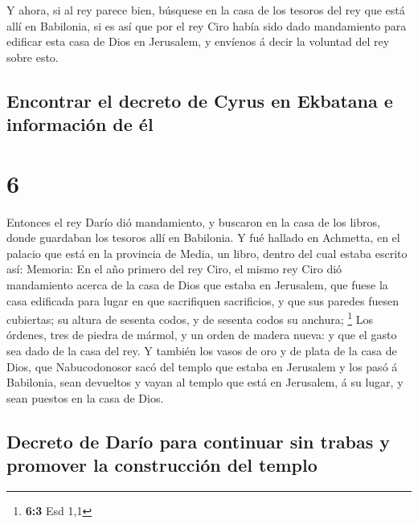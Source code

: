  Y ahora, si al rey parece bien, búsquese en la casa de los
tesoros del rey que está allí en Babilonia, si es así que por el rey
Ciro había sido dado mandamiento para edificar esta casa de Dios en
Jerusalem, y envíenos á decir la voluntad del rey sobre esto.

\hypertarget{encontrar-el-decreto-de-cyrus-en-ekbatana-e-informaciuxf3n-de-uxe9l}{%
\subsection{Encontrar el decreto de Cyrus en Ekbatana e información de
él}\label{encontrar-el-decreto-de-cyrus-en-ekbatana-e-informaciuxf3n-de-uxe9l}}

\hypertarget{section-5}{%
\section{6}\label{section-5}}

 Entonces el rey Darío dió mandamiento, y buscaron en la
casa de los libros, donde guardaban los tesoros allí en Babilonia.
 Y fué hallado en Achmetta, en el palacio que está en la
provincia de Media, un libro, dentro del cual estaba escrito así:
Memoria:  En el año primero del rey Ciro, el mismo rey Ciro
dió mandamiento acerca de la casa de Dios que estaba en Jerusalem, que
fuese la casa edificada para lugar en que sacrifiquen sacrificios, y que
sus paredes fuesen cubiertas; su altura de sesenta codos, y de sesenta
codos su anchura; \footnote{\textbf{6:3} Esd 1,1}  Los
órdenes, tres de piedra de mármol, y un orden de madera nueva: y que el
gasto sea dado de la casa del rey.  Y también los vasos de
oro y de plata de la casa de Dios, que Nabucodonosor sacó del templo que
estaba en Jerusalem y los pasó á Babilonia, sean devueltos y vayan al
templo que está en Jerusalem, á su lugar, y sean puestos en la casa de
Dios.

\hypertarget{decreto-de-daruxedo-para-continuar-sin-trabas-y-promover-la-construcciuxf3n-del-templo}{%
\subsection{Decreto de Darío para continuar sin trabas y promover la
construcción del
templo}\label{decreto-de-daruxedo-para-continuar-sin-trabas-y-promover-la-construcciuxf3n-del-templo}}

